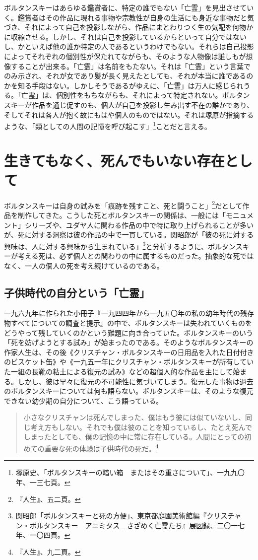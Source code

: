 \documentclass[b5j,twoside,twocolumn]{utarticle}
\newcommand{\mysection}[1]{\vspace{-5mm}\section{#1}\vspace{-2mm}}
\newcommand{\mysubsection}[1]{\vspace{-6mm}\subsection{#1}\vspace{-2mm}}
\begin{document}
ボルタンスキーはあらゆる鑑賞者に、特定の誰でもない「亡霊」を見出させていく。鑑賞者はその作品に現れる事物や宗教性が自身の生活にも身近な事物だと気づき、それによって自己を投影しながら、作品にまとわりつく生の気配を何物かに収縮させる。しかし、それは自己を投影しているからといって自分ではないし、かといえば他の誰か特定の人であるというわけでもない。それらは自己投影によってそれぞれの個別性が保たれてながらも、そのような人物像は誰しもが想像することが出来る。「亡霊」は名前をもたない。それは「亡霊」という言葉でのみ示され、それが女であり髪が長く見えたとしても、それが本当に誰であるのかを知る手段はない。しかしそうであるがゆえに、「亡霊」は万人に感じられうる。「亡霊」は、個別性をもちながらも、それによって特定されない。ボルタンスキーが作品を通じ促すのも、個人が自己を投影し生み出す不在の誰かであり、そしてそれは各人が抱く故にもはや個人のものではない。それは塚原が指摘するような、「類としての人間の記憶を呼び起こす」\footnote{塚原史、「ボルタンスキーの暗い箱　またはその重さについて」、一九九〇年、一三七頁。}ことだと言える。

\mysection{生きてもなく、死んでもいない存在として}
ボルタンスキーは自身の試みを「痕跡を残すこと、死と闘うこと」\footnote{『人生』、五二頁。}だとして作品を制作してきた。こうした死とボルタンスキーの関係は、一般には「モニュメント」シリーズや、ユダヤ人に関わる作品の中で特に取り上げられることが多いが、死に対する洞察は彼の作品の中で一貫している。関昭郎が「彼の死に対する興味は、人に対する興味から生まれている」\footnote{関昭郎「ボルタンスキーと死の方便」、東京都庭園美術館編『クリスチャン・ボルタンスキー　アニミタス＿さざめく亡霊たち』展図録、二〇一七年、一〇四頁。}と分析するように、ボルタンスキーが考える死は、必ず個人との関わりの中に属するものだった。抽象的な死ではなく、一人の個人の死を考え続けているのである。
\mysubsection{子供時代の自分という「亡霊」}
一九六九年に作られた小冊子『一九四四年から一九五〇年の私の幼年時代の残存物すべてについての調査と提示』の中で、ボルタンスキーは失われていくものをどうやって残していくのかという難題に向き合っていた。ボルタンスキーのいう「死を妨げようとする試み」が始まったのである。そのようなボルタンスキーの作家人生は、その後《クリスチャン・ボルタンスキーの日用品を入れた日付付きのビスケット缶》や《一九五一年にクリスチャン・ボルタンスキーが所有していた一組の長靴の粘土による復元の試み》などの超個人的な作品を主にして始まる。しかし、彼は早々に復元の不可能性に気づいてしまう。復元した事物は過去のボルタンスキーについては何も語らない。ボルタンスキーは、そのような復元できない幼少期の自分について、こう語っている。
\begin{quote}
小さなクリスチャンは死んでしまった、僕はもう彼には似ていないし、同じ考え方もしない。それでも僕は彼のことを知っているし、たとえ死んでしまったとしても、僕の記憶の中に常に存在している。人間にとっての初めての重要な死の体験は子供時代の死だ。\footnote{『人生』、九二頁。}
\end{quote}
\end{document}
